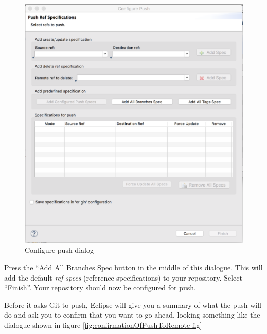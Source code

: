 \documentclass[
]{book}
\begin{document}
\begin{figure}

{\centering \includegraphics[width=1\linewidth]{images/configurePushRefSpecs} 

}

\caption{Configure push dialog}\label{fig:configurePushRefSpecs-fig}
\end{figure}

Press the ``Add All Branches Spec button in the middle of this dialogue. This will add the default \emph{ref specs} (reference specifications) to your repository. Select ``Finish''. Your repository should now be configured for push.

Before it asks Git to push, Eclipse will give you a summary of what the push will do and ask you to confirm that you want to go ahead, looking something like the dialogue shown in figure \ref{fig:confirmationOfPushToRemote-fig}
\end{document}
